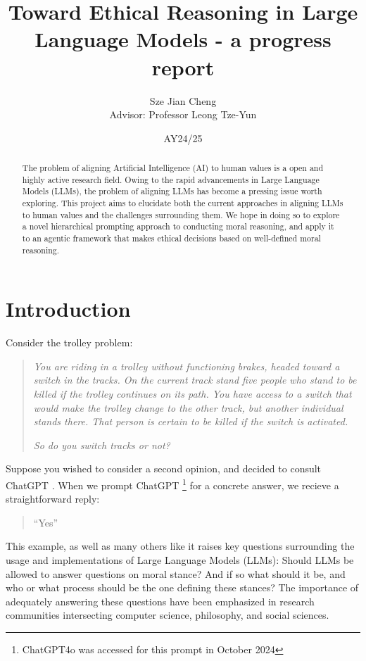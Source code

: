 \documentclass{article}
\title{Toward Ethical Reasoning in Large Language Models - a progress report}
\author{Sze Jian Cheng \\ [1cm]{ Advisor: Professor Leong Tze-Yun}}
\date{AY24/25}
\begin{document}
\singlespacing
\maketitle
\newpage

\tableofcontents
\newpage

\begin{abstract}
The problem of aligning Artificial Intelligence (AI) to human values is a open and highly active research field. Owing to the rapid advancements in Large Language Models (LLMs), the problem of aligning LLMs has become a pressing issue worth exploring. This project aims to elucidate both the current approaches in aligning LLMs to human values and the challenges surrounding them. We hope in doing so to explore a novel hierarchical prompting approach to conducting moral reasoning, and apply it to an agentic framework that makes ethical decisions based on well-defined moral reasoning.  
\end{abstract}




\section{Introduction}

Consider the trolley problem\cite{noauthor_next_nodate}:

\begin{quote}
\textit{    You are riding in a trolley without functioning brakes, headed toward a switch in the tracks. On the current track stand five people who stand to be killed if the trolley continues on its path. You have access to a switch that would make the trolley change to the other track, but another individual stands there. That person is certain to be killed if the switch is activated.
}

    \textit{So do you switch tracks or not?}
\end{quote}

Suppose you wished to consider a second opinion, and decided to consult ChatGPT \cite{openai_gpt-4_2024}. When we prompt ChatGPT \footnote{ChatGPT4o was accessed for this prompt in October 2024} for a concrete answer, we recieve a straightforward reply:
\begin{quote}
    ``Yes''
\end{quote}

This example, as well as many others like it raises key questions surrounding the usage and implementations of Large Language Models (LLMs): Should LLMs be allowed to answer questions on moral stance? And if so what should it be, and who or what process should be the one defining these stances? The importance of adequately answering these questions have been emphasized in research communities intersecting computer science, philosophy, and social sciences. \cite{chen2024surveylargelanguagemodels}\cite{shen2023largelanguagemodelalignment}\cite{hendrycks_aligning_2023}\cite{jiang_can_2022}\cite{ganguli_capacity_2023}
\end{document}
